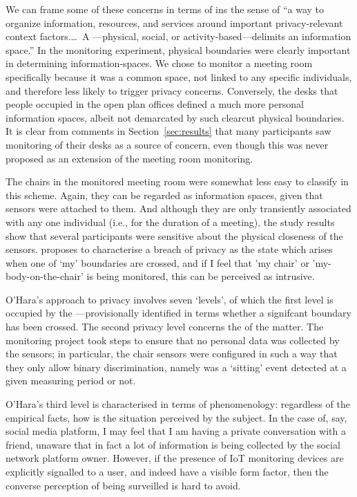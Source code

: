 We can frame some of these concerns in terms of  \cite{Jiang-2002-MPCI} ins the sense of ``a way to organize information, resources, and services
  around important privacy-relevant context factors.\ldots\  A
  ---physical, social, or activity-based---delimits an
  information space.'' In the monitoring experiment, physical boundaries were clearly
important in determining information-spaces. We chose to monitor a meeting room
specifically because it was a common space, not linked to any specific
individuals, and therefore less likely to trigger privacy
concerns. Conversely, the desks that people occupied in the open plan
offices defined a much more personal information spaces, albeit not
demarcated by such clearcut physical boundaries. It is clear from
comments in Section~\ref{sec:results} that many participants saw
monitoring of their desks as a source of concern, even though this was never
proposed as an extension of the meeting room monitoring.

The chairs in the monitored meeting room were somewhat less easy to
classify in this scheme. Again, they can be regarded as information
spaces, given that sensors were attached to them. And although they
are only transiently associated with any one individual (i.e., for the
duration of a meeting), the study results show that several participants were
sensitive about the physical closeness of the
sensors. \cite{Ohara-2016-TSVP} proposes to characterise a breach of privacy as
the state which arises when one of `my' boundaries are crossed, and if
I feel that 'my chair' or 'my-body-on-the-chair' is being monitored,
this can be perceived as intrusive. 

O'Hara's \cite{Ohara-2016-TSVP} approach to privacy involves seven
`levels', of which the first level is occupied by the ---provisionally identified in terms whether a
signifcant boundary has been crossed. The second privacy level concerns the  of the matter. The monitoring project took steps to ensure
that no personal data was collected by the sensors; in particular, the
chair sensors were configured in such a way that they only allow binary
discrimination, namely was a `sitting' event detected at a given
measuring period or not.

 O'Hara's third level is characterised in terms
of phenomenology: regardless of the empirical facts, how is the
situation perceived by the subject. In the case of, say, social media
platform, I may feel that I am having a private conversation with a
friend, unaware that in fact a lot of information is being collected
by the social network platform owner. However, if the presence of IoT
monitoring devices are explicitly signalled to a user, and indeed have
a visible form factor, then the converse perception of being
surveilled is hard to avoid.

